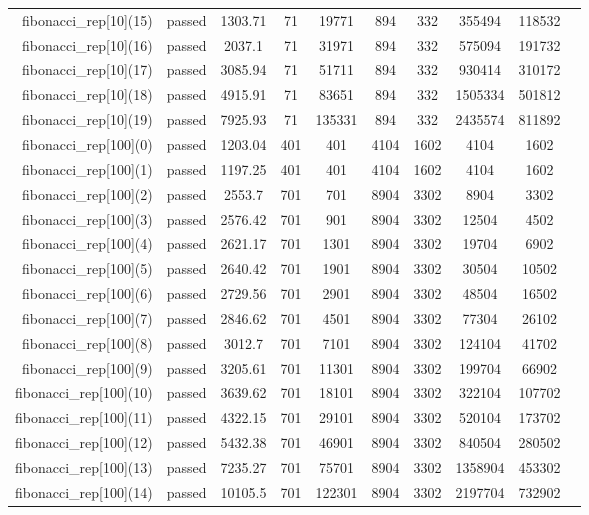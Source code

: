 \begin{longtable}{r|ccccccccc}
    fibonacci\_rep[10](15) & passed & 1303.71 & 71 & 19771 & 894 & 332 & 355494 & 118532 \\
    fibonacci\_rep[10](16) & passed & 2037.1 & 71 & 31971 & 894 & 332 & 575094 & 191732 \\
    fibonacci\_rep[10](17) & passed & 3085.94 & 71 & 51711 & 894 & 332 & 930414 & 310172 \\
    fibonacci\_rep[10](18) & passed & 4915.91 & 71 & 83651 & 894 & 332 & 1505334 & 501812 \\
    fibonacci\_rep[10](19) & passed & 7925.93 & 71 & 135331 & 894 & 332 & 2435574 & 811892 \\
    fibonacci\_rep[100](0) & passed & 1203.04 & 401 & 401 & 4104 & 1602 & 4104 & 1602 \\
    fibonacci\_rep[100](1) & passed & 1197.25 & 401 & 401 & 4104 & 1602 & 4104 & 1602 \\
    fibonacci\_rep[100](2) & passed & 2553.7 & 701 & 701 & 8904 & 3302 & 8904 & 3302 \\
    fibonacci\_rep[100](3) & passed & 2576.42 & 701 & 901 & 8904 & 3302 & 12504 & 4502 \\
    fibonacci\_rep[100](4) & passed & 2621.17 & 701 & 1301 & 8904 & 3302 & 19704 & 6902 \\
    fibonacci\_rep[100](5) & passed & 2640.42 & 701 & 1901 & 8904 & 3302 & 30504 & 10502 \\
    fibonacci\_rep[100](6) & passed & 2729.56 & 701 & 2901 & 8904 & 3302 & 48504 & 16502 \\
    fibonacci\_rep[100](7) & passed & 2846.62 & 701 & 4501 & 8904 & 3302 & 77304 & 26102 \\
    fibonacci\_rep[100](8) & passed & 3012.7 & 701 & 7101 & 8904 & 3302 & 124104 & 41702 \\
    fibonacci\_rep[100](9) & passed & 3205.61 & 701 & 11301 & 8904 & 3302 & 199704 & 66902 \\
    fibonacci\_rep[100](10) & passed & 3639.62 & 701 & 18101 & 8904 & 3302 & 322104 & 107702 \\
    fibonacci\_rep[100](11) & passed & 4322.15 & 701 & 29101 & 8904 & 3302 & 520104 & 173702 \\
    fibonacci\_rep[100](12) & passed & 5432.38 & 701 & 46901 & 8904 & 3302 & 840504 & 280502 \\
    fibonacci\_rep[100](13) & passed & 7235.27 & 701 & 75701 & 8904 & 3302 & 1358904 & 453302 \\
    fibonacci\_rep[100](14) & passed & 10105.5 & 701 & 122301 & 8904 & 3302 & 2197704 & 732902 \\

\end{longtable}

